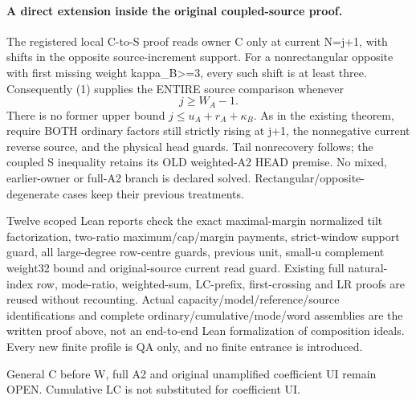 \paragraph{A direct extension inside the original coupled-source proof.}
The registered local C-to-S proof reads owner C only at current N=j+1,
with shifts in the opposite source-increment support.
For a nonrectangular opposite with first missing weight kappa_B>=3,
every such shift is at least three.
Consequently (1) supplies the ENTIRE source comparison whenever
\[
                                  j\ge W_A-1.
\]
There is no former upper bound $j\le u_A+r_A+\kappa_B$.
As in the existing theorem, require BOTH ordinary factors still
strictly rising at j+1, the nonnegative current reverse source,
and the physical head guards. Tail nonrecovery follows;
the coupled S inequality retains its OLD weighted-A2 HEAD premise.
No mixed, earlier-owner or full-A2 branch is declared solved.
Rectangular/opposite-degenerate cases keep their previous treatments.

Twelve scoped Lean reports check the exact maximal-margin normalized
tilt factorization, two-ratio maximum/cap/margin payments, strict-window
support guard, all large-degree row-centre guards, previous unit,
small-u complement weight32 bound and original-source current read guard.
Existing full natural-index row, mode-ratio, weighted-sum, LC-prefix,
first-crossing and LR proofs are reused without recounting.
Actual capacity/model/reference/source identifications and complete
ordinary/cumulative/mode/word assemblies are the written proof above,
not an end-to-end Lean formalization of composition ideals.
Every new finite profile is QA only, and no finite entrance is introduced.

General C before W, full A2 and original unamplified coefficient UI
remain OPEN. Cumulative LC is not substituted for coefficient UI.

